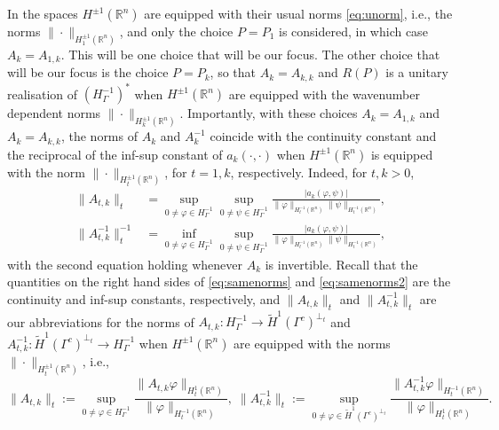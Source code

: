 \documentclass{birkjour}
\theoremstyle{definition}
\theoremstyle{remark}
\numberwithin{equation}{section}
\newcommand{\R}{\mathbb{R}}
\begin{document}
In \cite{caetano2025integral} the spaces $H^{\pm 1}(\R^n)$ are equipped with their usual norms \eqref{eq:unorm}, i.e., the norms $\|\cdot\|_{H_1^{\pm 1}(\R^n)}$, and only the choice $P=P_{1}$ is considered, in which case $A_k=A_{1,k}$. This will be one choice that will be our focus. The other choice that will be our focus is the choice $P=P_k$, so that $A_k=A_{k,k}$ and $R(P)$ is a unitary realisation of $(H^{-1}_\Gamma)^*$ when $H^{\pm 1}(\R^n)$ are equipped with the wavenumber dependent norms $\|\cdot\|_{H_k^{\pm 1}(\R^n)}$. Importantly, with these choices $A_k=A_{1,k}$ and $A_k=A_{k,k}$, the norms of $A_k$ and $A_k^{-1}$ coincide with the continuity constant and the reciprocal of the inf-sup constant of $a_k(\cdot,\cdot)$ when $H^{\pm 1}(\R^n)$ is equipped with the norm $\|\cdot\|_{H^{\pm 1}_t(\R^n)}$, for $t=1,k$, respectively.  Indeed, for $t,k>0$,
\begin{align} \label{eq:samenorms}
\|A_{t,k}\|_t &= \sup_{0\neq\varphi\in H_\Gamma^{-1}}  \sup_{0\neq \psi\in H_\Gamma^{-1}} \frac{|a_k(\varphi,\psi)|}{\|\varphi\|_{H^{-1}_t(\R^n)}  \|\psi\|_{H^{-1}_t(\R^n)}},\\ \label{eq:samenorms2}
\|A_{t,k}^{-1}\|^{-1}_t &= \inf_{0\neq\varphi\in H_\Gamma^{-1}}  \sup_{0\neq \psi\in H_\Gamma^{-1}} \frac{|a_k(\varphi,\psi)|}{\|\varphi\|_{H^{-1}_t(\R^n)}  \|\psi\|_{H^{-1}_t(\R^n)}},
\end{align}
with the second equation holding whenever $A_k$ is invertible. Recall that the quantities on the right hand sides of  \eqref{eq:samenorms} and \eqref{eq:samenorms2} are the continuity and inf-sup constants, respectively, and $\|A_{t,k}\|_t$ and $\|A_{t,k}^{-1}\|_t$ are our abbreviations for the norms of $A_{t,k}:H_\Gamma^{-1}\to \widetilde H^{1}(\Gamma^c)^{\perp_t}$ and $A_{t,k}^{-1}: \widetilde H^{1}(\Gamma^c)^{\perp_t}\to H_\Gamma^{-1}$ when $H^{\pm 1}(\R^n)$ are equipped with the norms $\|\cdot\|_{H^{\pm 1}_t(\R^n)}$, i.e.,
\begin{equation} \label{eq:normdef}
\|A_{t,k}\|_t  := \sup_{0\neq\varphi\in H_\Gamma^{-1}}  \frac{\|A_{t,k}\varphi\|_{H^1_t(\R^n)}}{\|\varphi\|_{H^{-1}_t(\R^n)}},  \; \|A_{t,k}^{-1}\|_t  := \sup_{0\neq\varphi\in \widetilde H^1(\Gamma^c)^{\perp_t}}  \frac{\|A^{-1}_{t,k}\varphi\|_{H^{-1}_t(\R^n)}}{\|\varphi\|_{H^{1}_t(\R^n)}}.
\end{equation}
\end{document}
